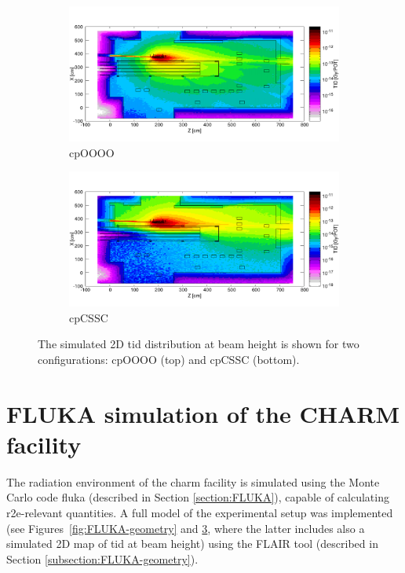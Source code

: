 \documentclass[encoding=utf8,british]{tumphthesis}
\begin{document}
\begin{figure}[H]
    \centering 
\begin{subfigure}{0.8\textwidth}
    \centering
  \includegraphics[width=\linewidth]{figures/TID_cpOOOO.png}
  \caption{cpOOOO}
  \label{fig:CHARM-TID-beamlevel-cpOOOO}
\end{subfigure}

\medskip

\begin{subfigure}{0.8\textwidth}
    \centering
  \includegraphics[width=\linewidth]{figures/TID_cpCSSC.png}
  \caption{cpCSSC}
  \label{fig:CHARM-TID-beamlevel-cpCSSC}
\end{subfigure}

    \caption{The simulated 2D \acrshort{tid} distribution at beam height is shown for two configurations: cpOOOO (top) and cpCSSC (bottom).}
    \label{fig:CHARM-TID-beamlevel}
\end{figure}


\section{FLUKA simulation of the CHARM facility}

The radiation environment of the \acrshort{charm} facility is simulated using the Monte Carlo code \acrshort{fluka} (described in Section \ref{section:FLUKA}), capable of calculating \acrshort{r2e}-relevant quantities. A full model of the experimental setup was implemented (see Figures~\ref{fig:FLUKA-geometry} and \ref{fig:CHARM-TID-beamlevel}, where the latter includes also a simulated 2D map of \acrshort{tid} at beam height) using the FLAIR tool (described in Section \ref{subsection:FLUKA-geometry}). 
\end{document}
